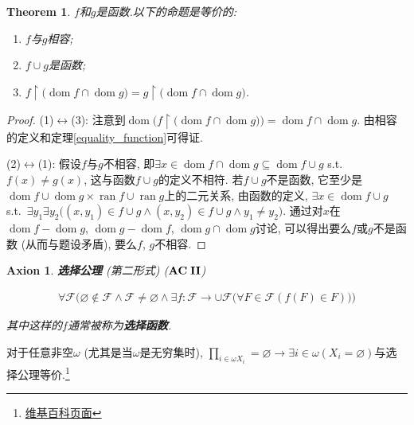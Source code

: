 \documentclass[UTF8,AutoFakeBold]{ctexart}
\makeatletter
\theoremstyle{plain}
\newtheorem{axion}{Axion} %
\newtheorem{theorem}{Theorem}[section] %
\theoremstyle{definition}
\newcommand*{\indexbf}[1]{\textit{\textbf{#1}}\index{#1}}
\newcommand*{\indexfm}[2]{#1\index{ 公式@笔记中出现的符号!#2@$#1$}}
\newcommand*{\properclass}[1]{\mathbf{#1}}
\DeclareMathOperator{\dom}{dom}
\DeclareMathOperator{\ran}{ran}
\makeatother
\begin{document}
\begin{theorem}\label{compatibility}
$f$和$g$是函数.以下的命题是等价的:
\begin{enumerate}[(1)]
\item $f$与$g$相容;
\item $f\cup g$是函数;
\item $f\upharpoonright \big(
	\dom f\cap \dom g\big) =
	g\upharpoonright \big(
	\dom f\cap \dom g\big)$.
\end{enumerate}

\end{theorem}
\begin{proof}
(1)$\leftrightarrow$(3): 注意到$\dom \Big(
	{f\upharpoonright \big(
		\dom f\cap \dom g\big)}\Big) = \dom f\cap \dom g$. 由相容的定义和定理\ref{equality_function}可得证.

(2)$\leftrightarrow$(1): 假设$f$与$g$不相容, 即$\exists x\in \dom f\cap \dom g\subseteq \dom{f\cup g}$ s.t.\ $f(x)\neq g(x)$, 这与函数$f\cup g$的定义不相符. 若$f\cup g$不是函数, 它至少是$\dom f\cup \dom g \times \ran f\cup \ran g$上的二元关系, 由函数的定义, $\exists x\in \dom{f\cup g}$ s.t.\ $\exists y_1\exists y_2\big(
	(x,y_1)\in f\cup g\wedge (x,y_2)\in f\cup g\wedge y_1\neq y_2\big)$. 通过对$x$在$\dom f - \dom g$, $\dom g - \dom f$, $\dom g\cap \dom g$讨论, 可以得出要么$f$或$g$不是函数 (从而与题设矛盾), 要么$f$, $g$不相容.
\end{proof}

\setcounter{axion}{8} %
\begin{axion}\label{AC2} \indexbf{选择公理} (第二形式) ($\indexfm{\properclass{AC\;II} }{AC2}$)

\begin{align*}
	\forall \mathcal F\Big(
		\varnothing \notin \mathcal F\wedge 
			\mathcal F\neq \varnothing \wedge
				\exists f\colon \mathcal F\to \cup \mathcal F \big(
					\forall F\in \mathcal F(
						f(F)\in F)\big)\Big)
\end{align*}

其中这样的$f$通常被称为\indexbf{选择函数}.
\end{axion}

对于任意非空$\omega$ (尤其是当$\omega$是无穷集时), $\prod_{i\in \omega X_i} = \varnothing \to \exists i\in \omega ( X_i = \varnothing)$与选择公理等价.\footnote{\href{https://zh.wikipedia.org/wiki/\%E7\%AC\%9B\%E5\%8D\%A1\%E5\%84\%BF\%E7\%A7\%AF\#\%E6\%97\%A0\%E7\%A9\%B7\%E4\%B9\%98\%E7\%A7\%AF
	}{维基百科页面}}
\end{document}
